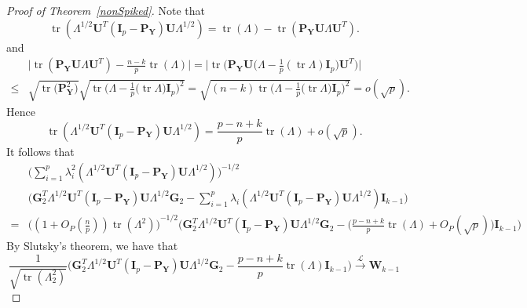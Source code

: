 \documentclass[12pt]{article} %
\DeclareMathOperator{\mytr}{tr}
\newcommand{\bP}{\mathbf{P}}
\newcommand{\bY}{\mathbf{Y}}
\newcommand{\bG}{\mathbf{G}}
\newcommand{\bI}{\mathbf{I}}
\newcommand{\bU}{\mathbf{U}}
\newcommand{\bW}{\mathbf{W}}
\theoremstyle{definition}
\begin{document}
\begin{proof}[\textrm{Proof of Theorem~\ref{nonSpiked}}]
Note that
    $$
    \mytr(\Lambda^{1/2}\bU^T (\bI_p-\bP_{\bY})\bU\Lambda^{1/2})
    =
    \mytr(\Lambda)-\mytr(\bP_{\bY}\bU\Lambda \bU^T).
    $$ 
and
    $$
    \begin{aligned}
        &
        \big|
    \mytr(\bP_{\bY}\bU\Lambda \bU^T)
    -\frac{n-k}{p}\mytr(\Lambda)
    \big|
    =
    \big|
    \mytr\Big(\bP_{\bY} \bU \big(\Lambda-\frac{1}{p} (\mytr \Lambda) \bI_p \big) \bU^T\Big)
    \big|
        \\
        \leq &
        \sqrt{\mytr \big(\bP_{\bY}^2\big)}
        \sqrt{\mytr \Big(\Lambda-\frac{1}{p}\big(\mytr \Lambda\big) \bI_p\Big)^2}
        =\sqrt{(n-k)\mytr \Big(\Lambda-\frac{1}{p}\big(\mytr \Lambda\big) \bI_p\Big)^2}
        =o(\sqrt{p}).
    \end{aligned}
    $$
    Hence 
    $$
    \mytr(\Lambda^{1/2}\bU^T (\bI_p-\bP_{\bY})\bU\Lambda^{1/2})
    =
    \frac{p-n+k}{p}\mytr(\Lambda)+o(\sqrt{p}).
    $$
    It follows that
    $$
    \begin{aligned}
        &\Big(\sum_{i=1}^p \lambda_i^2(\Lambda^{1/2}\bU^T(\bI_p-\bP_{\bY})\bU\Lambda^{1/2})\Big)^{-1/2}\\
        &{\Big( \bG_2^T \Lambda^{1/2}\bU^T (\bI_p-\bP_{\bY})\bU\Lambda^{1/2}\bG_2-\sum_{i=1}^p \lambda_i(\Lambda^{1/2}\bU^T(\bI_p-\bP_{\bY})\bU\Lambda^{1/2})\bI_{k-1}\Big)}\\
        =&
        {\Big( (1+O_P(\frac{n}{p}))\mytr (\Lambda^2)\Big) }^{-1/2} {\Big( \bG_2^T \Lambda^{1/2}\bU^T (\bI_p-\bP_{\bY})\bU\Lambda^{1/2}\bG_2-
        \big(\frac{p-n+k}{p}\mytr(\Lambda)+O_P(\sqrt{p})\big)\bI_{k-1}
        \Big)}
    \end{aligned}
    $$
    By Slutsky's theorem, we have that
    $$
    \frac{1}{\sqrt{\mytr(\Lambda_2^2)}}
    {\Big( \bG_2^T \Lambda^{1/2}\bU^T (\bI_p-\bP_{\bY})\bU\Lambda^{1/2}\bG_2-
        \frac{p-n+k}{p}\mytr(\Lambda)\bI_{k-1}\Big)}
    \xrightarrow{\mathcal{L}}\bW_{k-1}
    $$


\end{proof}
\end{document}
